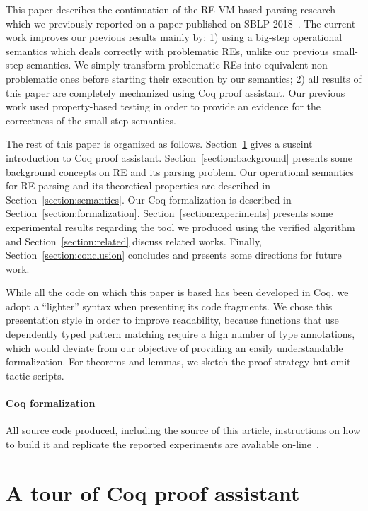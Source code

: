\documentclass[review]{elsarticle}
\theoremstyle{definition}
\begin{document}
This paper describes the continuation of the RE VM-based parsing research which we previously reported 
on a paper published on SBLP 2018~\cite{Delfino18}. The current work improves our previous results
mainly by: 1) using a big-step operational semantics which deals correctly with problematic REs, unlike
our previous small-step semantics. We simply transform problematic REs into
equivalent non-problematic ones before starting their execution by our semantics;
2) all results of this paper are completely mechanized using Coq
proof assistant. Our previous work used property-based testing in order to provide an evidence for 
the correctness of the small-step semantics.    

The rest of this paper is organized as follows. Section~\ref{section:coq} gives a 
suscint introduction to Coq proof assistant. Section~\ref{section:background} presents some 
background concepts on RE and its parsing problem. 
Our operational semantics for RE parsing and its theoretical properties
are described in Section~\ref{section:semantics}. Our Coq formalization is described in 
Section~\ref{section:formalization}.  Section~\ref{section:experiments} presents some experimental
results regarding the tool we produced using the verified algorithm and Section~\ref{section:related} discuss
related works. Finally, Section~\ref{section:conclusion} concludes and 
presents some directions for future work.

While all the code on which this paper is based has been developed in Coq,
we adopt a ``lighter'' syntax when presenting its code fragments. 
We chose this presentation style in order to improve readability, because
 functions that use dependently typed pattern matching require a high number of type
 annotations, which would deviate from our objective of providing an easily
 understandable formalization. For theorems and lemmas, we sketch the proof strategy 
 but omit tactic scripts.

\paragraph{Coq formalization} All source code produced, including the source of this article, 
instructions on how to build it and replicate the reported experiments are avaliable 
on-line~\cite{regexvm-rep}.

\section{A tour of Coq proof assistant}\label{section:coq}
\end{document}
